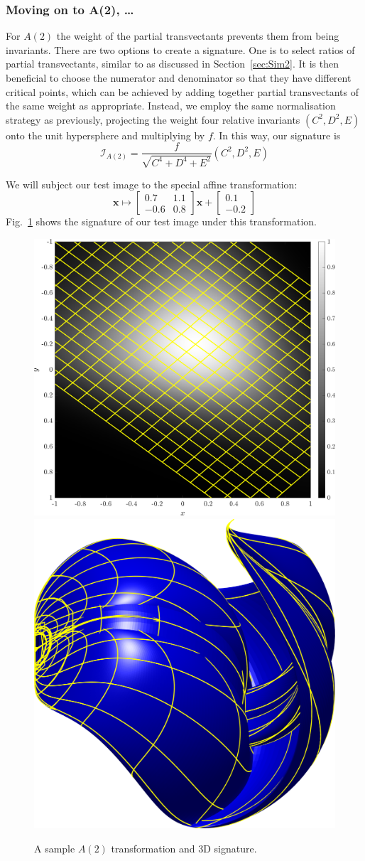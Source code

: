 \documentclass[review,onefignum,onetabnum]{siamonline190516}
\begin{document}
\subsubsection{Moving on to A(2), \ldots}

For $A(2)$ the weight of the partial transvectants prevents them from being
invariants. There are two options to create a signature. One is to select
ratios of partial transvectants, similar to as discussed in
Section~\ref{sec:Sim2}. It is then beneficial to choose the
numerator and denominator so that they have different critical points,
which can be achieved by adding together partial transvectants of the same
weight as appropriate. Instead, we employ the same normalisation strategy
as previously, projecting the weight four relative invariants $(C^2, D^2,
E)$ onto the unit hypersphere and multiplying by $f$. In this way, our
signature is
\begin{equation}
    \label{eq:A2signature}
    \mathcal{I}_{A(2)} = \frac{f}{\sqrt{C^4 + D^4 + E^2}}(C^2, D^2, E)
\end{equation}

We will subject our test image to the special affine transformation:
\begin{equation*}
\mathbf{x} \mapsto \begin{bmatrix} 0.7 & 1.1 \\ -0.6 & 0.8
\end{bmatrix}\mathbf{x} + \begin{bmatrix} 0.1 \\ -0.2 \end{bmatrix}
\end{equation*}
Fig.~\ref{fig:A2} shows the signature of our test image under this transformation.
\begin{figure}
\centering
\includegraphics[width=.45\textwidth]{Figs/f_transformed_A2.png}
\includegraphics[width=.45\textwidth]{Figs/A2_signature.png}
\caption{A sample $A(2)$ transformation and 3D signature.}
\label{fig:A2}
\end{figure}
\end{document}
